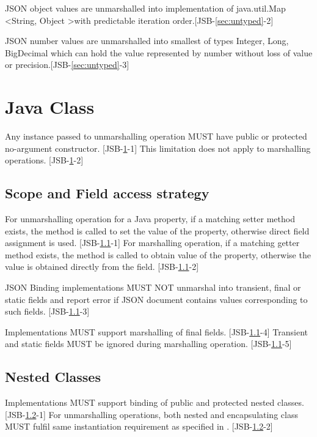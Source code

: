 JSON object values are unmarshalled into implementation of java.util.Map \textless String, Object \textgreater with predictable iteration order.[JSB-\ref{sec:untyped}-2]

JSON number values are unmarshalled into smallest of types Integer, Long, BigDecimal which can hold the value represented by number without loss of value or precision.[JSB-\ref{sec:untyped}-3]

\section{Java Class}
\label{sec:class}
Any instance passed to unmarshalling operation MUST have public or protected no-argument constructor. [JSB-\ref{sec:class}-1] This limitation does not apply to marshalling operations. [JSB-\ref{sec:class}-2]

\subsection{Scope and Field access strategy}
\label{subsec:fieldstrategy}
For unmarshalling operation for a Java property, if a matching setter method exists, the method is called to set the value of the property, otherwise direct field assignment is used. [JSB-\ref{subsec:fieldstrategy}-1] For marshalling operation, if a matching getter method exists, the method is called to obtain value of the property, otherwise the value is obtained directly from the field. [JSB-\ref{subsec:fieldstrategy}-2]

JSON Binding implementations MUST NOT unmarshal into transient, final or static fields and report error if JSON document contains values corresponding to such fields. [JSB-\ref{subsec:fieldstrategy}-3]

Implementations MUST support marshalling of final fields. [JSB-\ref{subsec:fieldstrategy}-4] Transient and static fields MUST be ignored during marshalling operation. [JSB-\ref{subsec:fieldstrategy}-5]

\subsection{Nested Classes}
\label{subsec:nestedclass}
Implementations MUST support binding of public and protected nested classes. [JSB-\ref{subsec:nestedclass}-1] For unmarshalling operations, both nested and encapsulating class  MUST fulfil same instantiation requirement as specified in . [JSB-\ref{subsec:nestedclass}-2]


